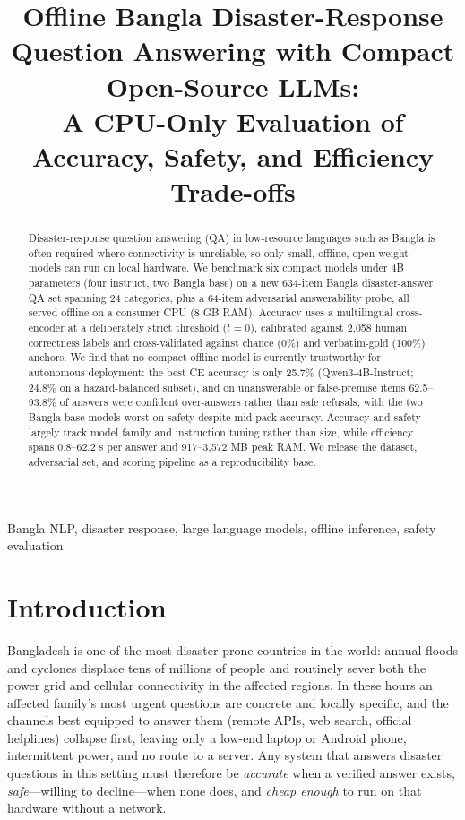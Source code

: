 \documentclass[conference]{IEEEtran}
\begin{document}
\title{Offline Bangla Disaster-Response Question Answering with Compact Open-Source LLMs:\\ A CPU-Only Evaluation of Accuracy, Safety, and Efficiency Trade-offs}
\maketitle

\begin{abstract}
Disaster-response question answering (QA) in low-resource languages such as Bangla is often required where connectivity is unreliable, so only small, offline, open-weight models can run on local hardware. We benchmark six compact models under 4B parameters (four instruct, two Bangla base) on a new 634-item Bangla disaster-answer QA set spanning 24 categories, plus a 64-item adversarial answerability probe, all served offline on a consumer CPU (8 GB RAM). Accuracy uses a multilingual cross-encoder at a deliberately strict threshold ($t=0$), calibrated against 2{,}058 human correctness labels and cross-validated against chance (0\%) and verbatim-gold (100\%) anchors. We find that no compact offline model is currently trustworthy for autonomous deployment: the best
CE accuracy is only 25.7\% (Qwen3-4B-Instruct; 24.8\% on a hazard-balanced subset), and on unanswerable or
false-premise items 62.5--93.8\% of answers were confident over-answers rather than safe refusals, with the two Bangla base models worst on safety despite mid-pack accuracy. Accuracy and safety largely track model family and instruction tuning rather than
size, while efficiency spans $0.8$--$62.2$ s per answer and 917--3{,}572 MB peak RAM. We release the
dataset, adversarial set, and scoring pipeline as a reproducibility base.
\end{abstract}

\begin{IEEEkeywords}
Bangla NLP, disaster response, large language models, offline inference, safety evaluation
\end{IEEEkeywords}

\section{Introduction}
Bangladesh is one of the most disaster-prone countries in the world: annual floods and cyclones
displace tens of
millions of people and routinely sever both the power grid and cellular connectivity in the affected
regions. In these hours an affected family's most urgent questions are concrete and locally
specific, and the channels best equipped to answer them (remote APIs, web search, official
helplines) collapse first, leaving only a low-end laptop or Android phone, intermittent power, and
no route to a server. Any system that answers disaster questions in this setting must therefore be
\emph{accurate} when a verified answer exists, \emph{safe}---willing to decline---when none does,
and \emph{cheap enough} to run on that hardware without a network.
\end{document}
